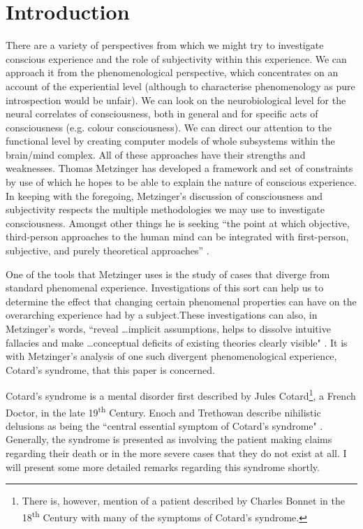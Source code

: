 
\chapter{Introduction}
\label{chap:intro}

There are a variety of perspectives from which we might try to investigate conscious experience and the role of subjectivity within this experience. We can approach it from the phenomenological perspective, which concentrates on an account of the experiential level (although to characterise phenomenology as pure introspection would be unfair). We can look on the neurobiological level for the neural correlates of consciousness, both in general and for specific acts of consciousness (e.g. colour consciousness). We can direct our attention to the functional level by creating computer models of whole subsystems within the brain/mind complex. All of these approaches have their strengths and weaknesses. Thomas Metzinger has developed a framework and set of constraints by use of which he hopes to be able to explain the nature of conscious experience. In keeping with the foregoing, Metzinger’s discussion of consciousness and subjectivity respects the multiple methodologies we may use to investigate consciousness. Amongst other things he is seeking “the point at which objective, third-person approaches to the human mind can be integrated with first-person, subjective, and purely theoretical approaches” \cite{metzinger2003}.

One of the tools that Metzinger uses is the study of cases that diverge from standard phenomenal experience. Investigations of this sort can help us to determine the effect that changing certain phenomenal properties can have on the overarching experience had by a subject.These investigations can also, in Metzinger's words, ``reveal \ldots implicit assumptions, helps to dissolve intuitive fallacies and make \ldots conceptual deficits of existing theories clearly visible" \cite[p. 213]{metzinger2003}. It is with Metzinger's analysis of one such divergent phenomenological experience, Cotard's syndrome, that this paper is concerned.

Cotard's syndrome is a mental disorder first described by Jules Cotard\footnote{There is, however, mention of a patient described by Charles Bonnet in the 18\textsuperscript{th} Century with many of the symptoms of Cotard's syndrome\cite{forstl1992}.}, a French Doctor, in the late 19\textsuperscript{th} Century. Enoch and Trethowan describe nihilistic delusions as being the ``central essential symptom of Cotard's syndrome" \cite[p. 172]{enoch1991}. Generally, the syndrome is presented as involving the patient making claims regarding their death or in the more severe cases that they do not exist at all. I will present some more detailed remarks regarding this syndrome shortly.

